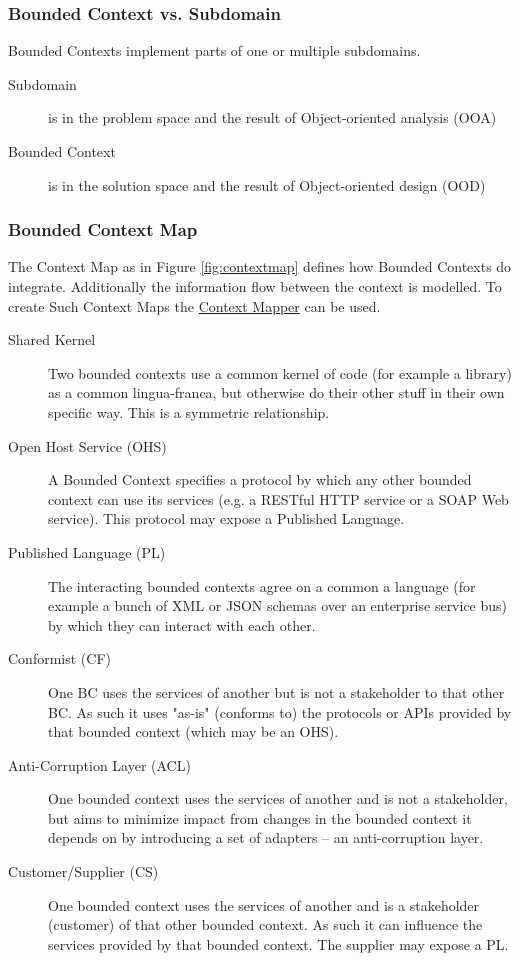 \subsubsection{Bounded Context vs. Subdomain}
Bounded Contexts implement parts of one or multiple subdomains. 

\begin{description}
	\item [Subdomain] is in the problem space and the result of Object-oriented analysis (OOA)
	\item [Bounded Context] is in the solution space and the result of Object-oriented design (OOD)
\end{description}

\subsubsection{Bounded Context Map}
The Context Map as in Figure \ref{fig:contextmap} defines how Bounded Contexts do integrate. Additionally the information flow between the context is modelled.  To create Such Context Maps the \href{https://contextmapper.org/}{Context Mapper} can be used.

\begin{description}
	\item [Shared Kernel] Two bounded contexts use a common kernel of code (for example a library) as a common lingua-franca, but otherwise do their other stuff in their own specific way. This is a symmetric relationship.
	\item [Open Host Service (OHS)] A Bounded Context specifies a protocol by which any other bounded context can use its services (e.g. a RESTful HTTP service or a SOAP Web service). This protocol may expose a Published Language.
	\item [Published Language (PL)] The interacting bounded contexts agree on a common a language (for example a bunch of XML or JSON schemas over an enterprise service bus) by which they can interact with each other. 
	\item [Conformist (CF)] One BC uses the services of another but is not a stakeholder to that other BC. As such it uses "as-is" (conforms to) the protocols or APIs provided by that bounded context (which may be an OHS).
	\item [Anti-Corruption Layer (ACL)] One bounded context uses the services of another and is not a stakeholder, but aims to minimize impact from changes in the bounded context it depends on by introducing a set of adapters – an anti-corruption layer.
	\item [Customer/Supplier (CS)]  One bounded context uses the services of another and is a stakeholder (customer) of that other bounded context. As such it can influence the services provided by that bounded context. The supplier may expose a PL.
\end{description} 

